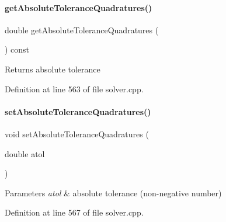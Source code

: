 \paragraph{\texorpdfstring{get\+Absolute\+Tolerance\+Quadratures()}{getAbsoluteToleranceQuadratures()}}
{\footnotesize\ttfamily double get\+Absolute\+Tolerance\+Quadratures (\begin{DoxyParamCaption}{ }\end{DoxyParamCaption}) const}

\begin{DoxyReturn}{Returns}
absolute tolerance 
\end{DoxyReturn}


Definition at line 563 of file solver.\+cpp.

\mbox{\label{classamici_1_1_solver_af425163c5d98c472d17e080da4ee3b78}} 
\paragraph{\texorpdfstring{set\+Absolute\+Tolerance\+Quadratures()}{setAbsoluteToleranceQuadratures()}}
{\footnotesize\ttfamily void set\+Absolute\+Tolerance\+Quadratures (\begin{DoxyParamCaption}\item[{double}]{atol }\end{DoxyParamCaption})}


\begin{DoxyParams}{Parameters}
{\em atol} & absolute tolerance (non-\/negative number) \\
\hline
\end{DoxyParams}


Definition at line 567 of file solver.\+cpp.

